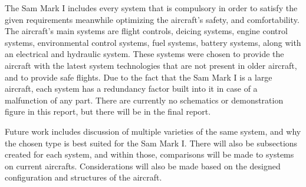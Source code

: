 The Sam Mark I includes every system that is compulsory in order to satisfy the given requirements meanwhile optimizing the aircraft's safety, and comfortability. The aircraft's main systems are flight controls, deicing systems, engine control systems, environmental control systems, fuel systems, battery systems, along with an electrical and hydraulic system. These systems were chosen to provide the aircraft with the latest system technologies that are not present in older aircraft, and to provide safe flights. Due to the fact that the Sam Mark I is a large aircraft, each system has a redundancy factor built into it in case of a malfunction of any part. There are currently no schematics or demonstration figure in this report, but there will be in the final report. 

Future work includes discussion of multiple varieties of the same system, and why the chosen type is best suited for the Sam Mark I. There will also be subsections created for each system, and within those, comparisons will be made to systems on current aircrafts. Considerations will also be made based on the designed configuration and structures of the aircraft.  

